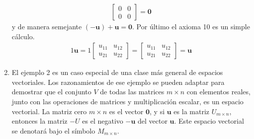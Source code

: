 \documentclass[a4paper,12pt]{article}
\begin{document}
\begin{enumerate}[\textsc{Ejemplo} 1:, wide=\parindent]
\begin{align*}
\begin{bmatrix}
        0 & 0 \\
        0 & 0
      \end{bmatrix}
      = \mathbf{0}
    \end{align*}
    y de manera semejante $(-\mathbf{u})+\mathbf{u}=\mathbf{0}$. Por último el
    axioma 10 es un simple cálculo.
    \begin{align*}
      1\mathbf{u}=1
      \begin{bmatrix}
        u_{11} & u_{12} \\
        u_{21} & u_{22}
      \end{bmatrix}
      =
      \begin{bmatrix}
        u_{11} & u_{12} \\
        u_{21} & u_{22}
      \end{bmatrix}
      =\mathbf{u}
    \end{align*}

  \item El ejemplo 2 es un caso especial de una clase más general de espacios
    vectoriales. Los razonamientos de ese ejemplo se pueden adaptar para
    demostrar que el conjunto $V$ de todas las matrices $m\times n$ con
    elementos reales, junto con las operaciones de matrices y multiplicación
    escalar, es un espacio vectorial. La matriz cero $m\times n$ es el vector
    $\mathbf{0}$, y si $\mathbf{u}$ es la matriz $U_{m\times n}$, entonces la
    matriz $-U$ es el negativo $-\mathbf{u}$ del vector $\mathbf{u}$. Este
    espacio vectorial se denotará bajo el símbolo $M_{m\times n}$.
\end{enumerate}
\end{document}
